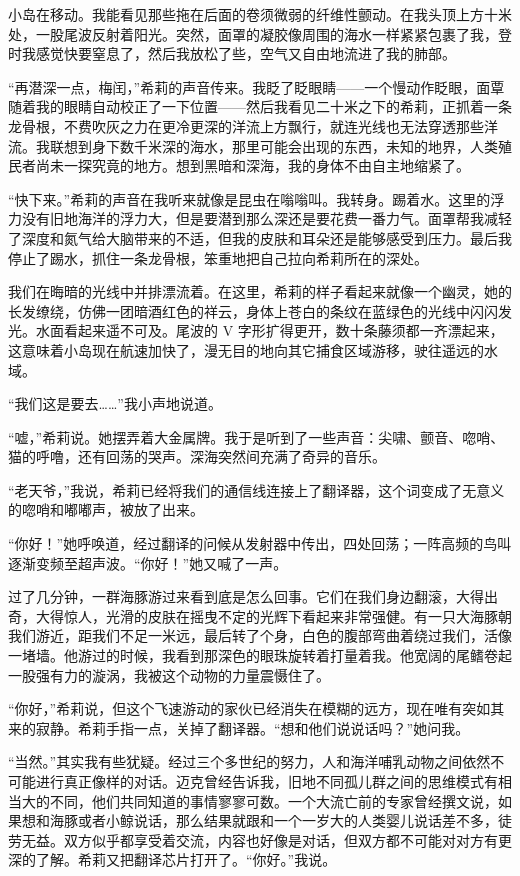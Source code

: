 \documentclass[AutoFakeBold=true]{book}
\begin{document}
小岛在移动。我能看见那些拖在后面的卷须微弱的纤维性颤动。在我头顶上方十米处，一股尾波反射着阳光。突然，面罩的凝胶像周围的海水一样紧紧包裹了我，登时我感觉快要窒息了，然后我放松了些，空气又自由地流进了我的肺部。

``再潜深一点，梅闰，''希莉的声音传来。我眨了眨眼睛——一个慢动作眨眼，面覃随着我的眼睛自动校正了一下位置——然后我看见二十米之下的希莉，正抓着一条龙骨根，不费吹灰之力在更冷更深的洋流上方飘行，就连光线也无法穿透那些洋流。我联想到身下数千米深的海水，那里可能会出现的东西，未知的地界，人类殖民者尚未一探究竟的地方。想到黑暗和深海，我的身体不由自主地缩紧了。

``快下来。''希莉的声音在我听来就像是昆虫在嗡嗡叫。我转身。踢着水。这里的浮力没有旧地海洋的浮力大，但是要潜到那么深还是要花费一番力气。面罩帮我减轻了深度和氮气给大脑带来的不适，但我的皮肤和耳朵还是能够感受到压力。最后我停止了踢水，抓住一条龙骨根，笨重地把自己拉向希莉所在的深处。

我们在晦暗的光线中并排漂流着。在这里，希莉的样子看起来就像一个幽灵，她的长发缭绕，仿佛一团暗酒红色的祥云，身体上苍白的条纹在蓝绿色的光线中闪闪发光。水面看起来遥不可及。尾波的 V 字形扩得更开，数十条藤须都一齐漂起来，这意味着小岛现在航速加快了，漫无目的地向其它捕食区域游移，驶往遥远的水域。

``我们这是要去……''我小声地说道。

``嘘，''希莉说。她摆弄着大金属牌。我于是听到了一些声音：尖啸、颤音、唿哨、猫的呼噜，还有回荡的哭声。深海突然间充满了奇异的音乐。

``老天爷，''我说，希莉已经将我们的通信线连接上了翻译器，这个词变成了无意义的唿哨和嘟嘟声，被放了出来。

``你好！''她呼唤道，经过翻译的问候从发射器中传出，四处回荡；一阵高频的鸟叫逐渐变频至超声波。``你好！''她又喊了一声。

过了几分钟，一群海豚游过来看到底是怎么回事。它们在我们身边翻滚，大得出奇，大得惊人，光滑的皮肤在摇曳不定的光辉下看起来非常强健。有一只大海豚朝我们游近，距我们不足一米远，最后转了个身，白色的腹部弯曲着绕过我们，活像一堵墙。他游过的时候，我看到那深色的眼珠旋转着打量着我。他宽阔的尾鳍卷起一股强有力的漩涡，我被这个动物的力量震慑住了。

``你好，''希莉说，但这个飞速游动的家伙已经消失在模糊的远方，现在唯有突如其来的寂静。希莉手指一点，关掉了翻译器。``想和他们说说话吗？''她问我。

``当然。''其实我有些犹疑。经过三个多世纪的努力，人和海洋哺乳动物之间依然不可能进行真正像样的对话。迈克曾经告诉我，旧地不同孤儿群之间的思维模式有相当大的不同，他们共同知道的事情寥寥可数。一个大流亡前的专家曾经撰文说，如果想和海豚或者小鲸说话，那么结果就跟和一个一岁大的人类婴儿说话差不多，徒劳无益。双方似乎都享受着交流，内容也好像是对话，但双方都不可能对对方有更深的了解。希莉又把翻译芯片打开了。``你好。''我说。
\end{document}
